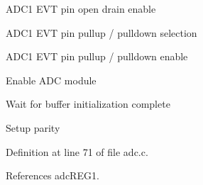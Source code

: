 \begin{DoxyItemize}
\item A\+D\+C1 E\+VT pin open drain enable ~\newline
~\newline
~\newline
~\newline
~\newline

\item A\+D\+C1 E\+VT pin pullup / pulldown selection ~\newline
~\newline
~\newline
~\newline

\item A\+D\+C1 E\+VT pin pullup / pulldown enable
\item Enable A\+DC module ~\newline
~\newline

\item Wait for buffer initialization complete ~\newline

\item Setup parity 
\end{DoxyItemize}

Definition at line 71 of file adc.\+c.



References adc\+R\+E\+G1.


